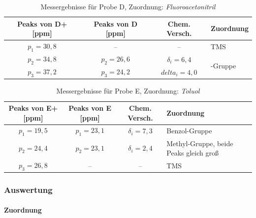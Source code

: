 \documentclass[a4paper]{scrartcl} %
\begin{document}
\begin{table}[!htb]
	\centering
	\caption{Messergebnisse für Probe D, Zuordnung: \emph{Fluoroacetonitril} }
	\label{tab:Probe_D}
	\begin{tabularx}{1.0\linewidth}{cccX}
		\toprule 
		Peaks von D+ [ppm] & Peaks von D [ppm] & Chem. Versch. & Zuordnung \\ 
		\midrule
		$p_1 = 30,8$ & -- & -- & TMS \\ 
		
		$p_2 = 34,8$ & $p_2 = 26,6$ & $\delta_i = 6,4$ & \multirow{2}{*}{\ce{FCH2}-Gruppe} \\ 
		
		$p_3 = 37,2$ & $p_3 = 24,2$ & $delta_i = 4,0$ &  \\ 
		
		\bottomrule 
	\end{tabularx}
	
\end{table}

\begin{table}[!htb]
	\centering
	\caption{Messergebnisse für Probe E, Zuordnung: \emph{Toluol} }
	\label{tab:Probe_E}
	\begin{tabularx}{1.0\linewidth}{cccX}
		\toprule 
		Peaks von E+ [ppm] & Peaks von E [ppm] & Chem. Versch. & Zuordnung \\ 
		\midrule
		$p_1 = 19,5$ & $p_1 = 23,1$ & $\delta_i = 7,3 $ & Benzol-Gruppe \\ 
		
		$p_2 = 24,4$ & $p_2 = 23,1$ & $\delta_i = 2,4$ & Methyl-Gruppe, beide Peaks gleich groß \\ 
		
		$p_3 = 26,8$ & -- & -- & TMS \\ 
		
		\bottomrule 
	\end{tabularx}
	
\end{table}

\subsubsection{Auswertung}
\paragraph{Zuordnung}
\end{document}
